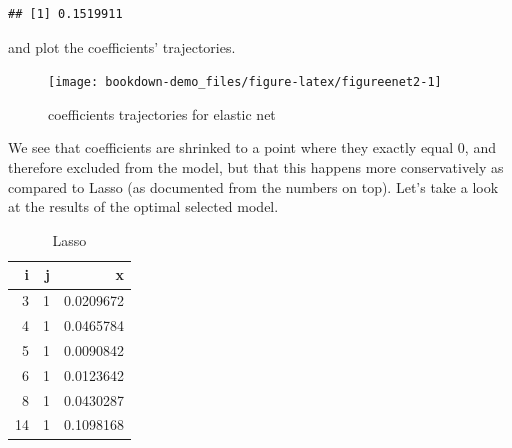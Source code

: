 \documentclass[
]{book}
\newenvironment{Shaded}{\begin{snugshade}}{\end{snugshade}}
\newcommand{\AttributeTok}[1]{\textcolor[rgb]{0.77,0.63,0.00}{#1}}
\newcommand{\CommentTok}[1]{\textcolor[rgb]{0.56,0.35,0.01}{\textit{#1}}}
\newcommand{\ConstantTok}[1]{\textcolor[rgb]{0.00,0.00,0.00}{#1}}
\newcommand{\FloatTok}[1]{\textcolor[rgb]{0.00,0.00,0.81}{#1}}
\newcommand{\FunctionTok}[1]{\textcolor[rgb]{0.00,0.00,0.00}{#1}}
\newcommand{\NormalTok}[1]{#1}
\newcommand{\OtherTok}[1]{\textcolor[rgb]{0.56,0.35,0.01}{#1}}
\newcommand{\SpecialCharTok}[1]{\textcolor[rgb]{0.00,0.00,0.00}{#1}}
\newcommand{\StringTok}[1]{\textcolor[rgb]{0.31,0.60,0.02}{#1}}
\begin{document}
\begin{Shaded}
\end{Shaded}

\begin{verbatim}
## [1] 0.1519911
\end{verbatim}

and plot the coefficients' trajectories.

\begin{figure}[H]

{\centering \texttt{[image: bookdown-demo\_files/figure-latex/figureenet2-1]} 

}

\caption{coefficients trajectories for elastic net}\label{fig:figureenet2}
\end{figure}

We see that coefficients are shrinked to a point where they exactly equal 0, and therefore excluded from the model, but that this happens more conservatively as compared to Lasso (as documented from the numbers on top). Let's take a look at the results of the optimal selected model.

\begin{Shaded}
\end{Shaded}

\begin{table}

\caption{\label{tab:unnamed-chunk-18}Lasso}
\centering
\begin{tabular}[t]{r|r|r}
\hline
i & j & x\\
\hline
3 & 1 & 0.0209672\\
\hline
4 & 1 & 0.0465784\\
\hline
5 & 1 & 0.0090842\\
\hline
6 & 1 & 0.0123642\\
\hline
8 & 1 & 0.0430287\\
\hline
14 & 1 & 0.1098168\\
\hline
\end{tabular}
\end{table}
\end{document}
